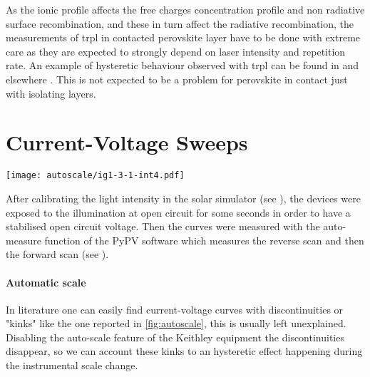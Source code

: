 		As the ionic profile affects the free charges concentration profile and non radiative surface recombination, and these in turn affect the radiative recombination, the measurements of \gls{trpl} in contacted perovskite layer have to be done with extreme care as they are expected to strongly depend on laser intensity and repetition rate.
		An example of hysteretic behaviour observed with \gls{trpl} can be found in  and elsewhere \cite{Chen2015,Chen2017}.
		This is not expected to be a problem for perovskite in contact just with isolating layers.

\section{Current-Voltage Sweeps}

	\begin{SCfigure}%
		\centering
		\texttt{[image: autoscale/ig1-3-1-int4.pdf]}
		\label{fig:autoscale}
	\end{SCfigure}

	After calibrating the light intensity in the solar simulator (see ), the devices were exposed to the illumination at open circuit for some seconds in order to have a stabilised open circuit voltage.
	Then the curves were measured with the auto-measure function of the PyPV software which measures the reverse scan and then the forward scan (see ).

	\paragraph{Automatic scale}\label{autoscale}
	In literature one can easily find current\hyp{}voltage curves with discontinuities or "kinks" \cite{Li2016,Snaith2014,Zhang2015} like the one reported in \cref{fig:autoscale}, this is usually left unexplained.
	Disabling the auto-scale feature of the Keithley equipment the discontinuities disappear, so we can account these kinks to an hysteretic effect happening during the instrumental scale change.



